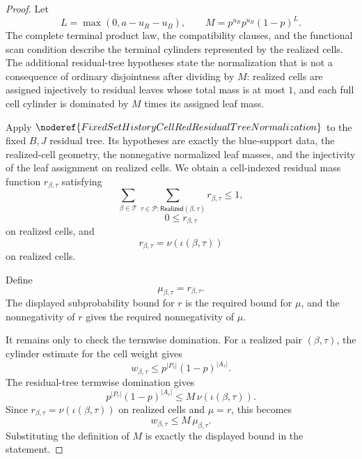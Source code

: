 \begin{proof}
Let
\[
L=\max(0,a-u_R-u_B),\qquad
M=p^{u_R}p^{u_B}(1-p)^L .
\]
The complete terminal product law, the compatibility clauses, and the
functional scan condition describe the terminal cylinders represented by the
realized cells.  The additional residual-tree hypotheses state the
normalization that is not a consequence of ordinary disjointness after
dividing by \(M\): realized cells are assigned injectively to residual leaves
whose total mass is at most \(1\), and each full cell cylinder is dominated
by \(M\) times its assigned leaf mass.

Apply \(\noderef{FixedSetHistoryCellRedResidualTreeNormalization}\) to the
fixed \(B,J\) residual tree.  Its hypotheses are exactly the blue-support
data, the realized-cell geometry, the nonnegative normalized leaf masses, and
the injectivity of the leaf assignment on realized cells.  We obtain a
cell-indexed residual mass function \(r_{\beta,\tau}\) satisfying
\[
\sum_{\beta\in\mathcal T}
  \sum_{\tau\in\mathcal P:\mathsf{Realized}(\beta,\tau)}
    r_{\beta,\tau}\le1,
\]
\[
0\le r_{\beta,\tau}
\]
on realized cells, and
\[
r_{\beta,\tau}=\nu(\iota(\beta,\tau))
\]
on realized cells.

Define
\[
\mu_{\beta,\tau}=r_{\beta,\tau}.
\]
The displayed subprobability bound for \(r\) is the required bound for
\(\mu\), and the nonnegativity of \(r\) gives the required nonnegativity of
\(\mu\).

It remains only to check the termwise domination.  For a realized pair
\((\beta,\tau)\), the cylinder estimate for the cell weight gives
\[
w_{\beta,\tau}\le p^{|P_\tau|}(1-p)^{|A_\tau|}.
\]
The residual-tree termwise domination gives
\[
p^{|P_\tau|}(1-p)^{|A_\tau|}
\le
M\,\nu(\iota(\beta,\tau)).
\]
Since \(r_{\beta,\tau}=\nu(\iota(\beta,\tau))\) on realized cells and
\(\mu=r\), this becomes
\[
w_{\beta,\tau}\le M\,\mu_{\beta,\tau}.
\]
Substituting the definition of \(M\) is exactly the displayed bound in the
statement.
\end{proof}
